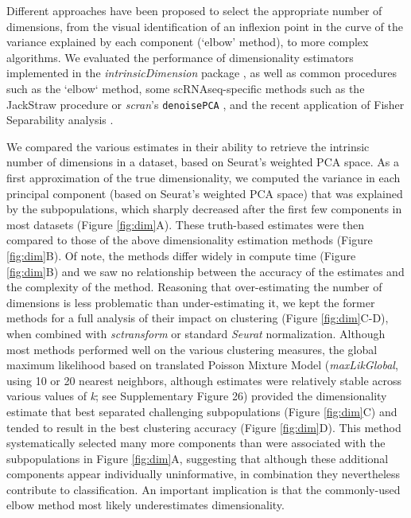 \documentclass{bmcart}
\begin{document}
Different approaches have been proposed to select the appropriate number of dimensions, from the visual identification of an {\color{red}inflexion point in the curve of the variance explained by each component (`elbow' method), to more complex algorithms.} We evaluated the performance of dimensionality estimators implemented in the \textit{intrinsicDimension} package \cite{johnssonDimensionality2015}, as well as common procedures such as the `elbow` method, some scRNAseq-specific methods such as the JackStraw procedure \cite{ChungJackstraw2015} or \textit{scran}'s \texttt{denoisePCA} \cite{LunScran2016}, and the recent application of Fisher Separability analysis \cite{AlberganteSepar2019}.

{\color{red}We compared the various estimates in their ability to retrieve the intrinsic number of dimensions in a dataset, based on Seurat's weighted PCA space. As a first approximation of the true dimensionality, we computed the variance in each principal component (based on Seurat's weighted PCA space) that was explained by the subpopulations, which sharply decreased after the first few components in most datasets (Figure \ref{fig:dim}A). These truth-based estimates were then compared to those of the above dimensionality estimation methods (Figure \ref{fig:dim}B).} Of note, the methods differ widely in compute time (Figure \ref{fig:dim}B) and we saw no relationship between the accuracy of the estimates and the complexity of the method. Reasoning that over-estimating the number of dimensions is less problematic than under-estimating it, we kept the former methods for a full analysis of their impact on clustering (Figure \ref{fig:dim}C-D), when combined with \textit{sctransform} or standard \textit{Seurat} normalization. Although most methods performed well on the various clustering measures, the global maximum likelihood based on translated Poisson Mixture Model {\color{red}(\textit{maxLikGlobal}, using 10 or 20 nearest neighbors, although estimates were relatively stable across various values of \textit{k}; see Supplementary Figure 26) provided the dimensionality estimate that best separated challenging subpopulations (Figure \ref{fig:dim}C) and tended to result in the best clustering accuracy (Figure \ref{fig:dim}D). This method systematically selected many more components than were associated with the subpopulations in Figure \ref{fig:dim}A, suggesting that although these additional components appear individually uninformative, in combination they nevertheless contribute to classification. An important implication is that the commonly-used elbow method most likely underestimates dimensionality.}
\end{document}
